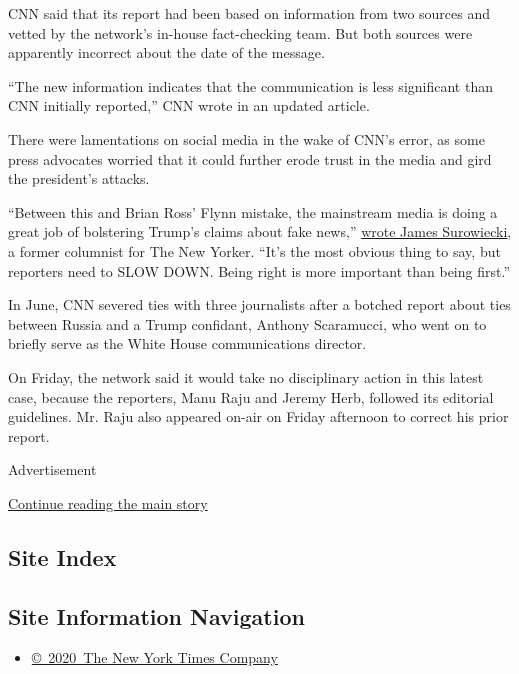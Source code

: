 CNN said that its report had been based on information from two sources
and vetted by the network's in-house fact-checking team. But both
sources were apparently incorrect about the date of the message.

``The new information indicates that the communication is less
significant than CNN initially reported,'' CNN wrote in an updated
article.

There were lamentations on social media in the wake of CNN's error, as
some press advocates worried that it could further erode trust in the
media and gird the president's attacks.

``Between this and Brian Ross' Flynn mistake, the mainstream media is
doing a great job of bolstering Trump's claims about fake news,''
\href{https://twitter.com/JamesSurowiecki/status/939250661916659712}{wrote
James Surowiecki}, a former columnist for The New Yorker. ``It's the
most obvious thing to say, but reporters need to SLOW DOWN. Being right
is more important than being first.''

In June, CNN severed ties with three journalists after a botched report
about ties between Russia and a Trump confidant, Anthony Scaramucci, who
went on to briefly serve as the White House communications director.

On Friday, the network said it would take no disciplinary action in this
latest case, because the reporters, Manu Raju and Jeremy Herb, followed
its editorial guidelines. Mr. Raju also appeared on-air on Friday
afternoon to correct his prior report.

Advertisement

\protect\hyperlink{after-bottom}{Continue reading the main story}

\hypertarget{site-index}{%
\subsection{Site Index}\label{site-index}}

\hypertarget{site-information-navigation}{%
\subsection{Site Information
Navigation}\label{site-information-navigation}}

\begin{itemize}
\tightlist
\item
  \href{https://help.nytimes3xbfgragh.onion/hc/en-us/articles/115014792127-Copyright-notice}{©~2020~The
  New York Times Company}
\end{itemize}

